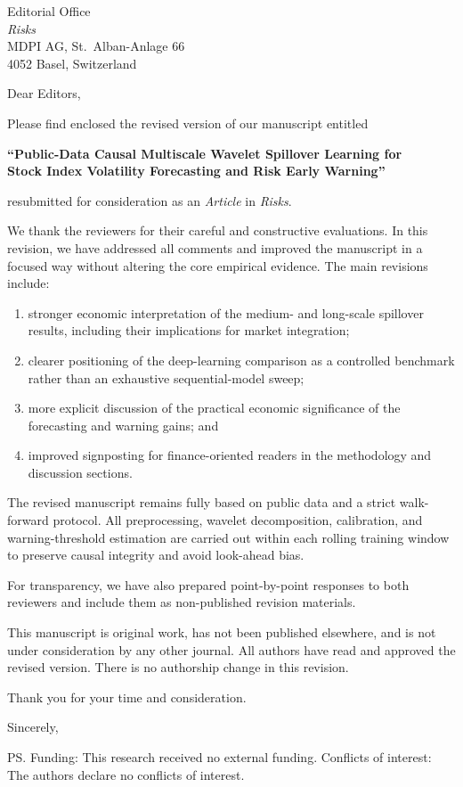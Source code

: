 \documentclass[11pt, a4paper]{letter}
\date{26 May 2026}
\begin{document}
\begin{letter}{%
  Editorial Office\\
  \textit{Risks}\\
  MDPI AG, St.\ Alban-Anlage 66\\
  4052 Basel, Switzerland
}

\opening{Dear Editors,}

Please find enclosed the revised version of our manuscript entitled

\begin{center}
  \textbf{``Public-Data Causal Multiscale Wavelet Spillover Learning for\\
  Stock Index Volatility Forecasting and Risk Early Warning''}
\end{center}

\noindent resubmitted for consideration as an \textit{Article} in
\textit{Risks}.

We thank the reviewers for their careful and constructive evaluations.
In this revision, we have addressed all comments and improved the
manuscript in a focused way without altering the core empirical evidence.
The main revisions include:
\begin{enumerate}
  \item stronger economic interpretation of the medium- and long-scale
    spillover results, including their implications for market integration;
  \item clearer positioning of the deep-learning comparison as a
    controlled benchmark rather than an exhaustive sequential-model sweep;
  \item more explicit discussion of the practical economic significance of
    the forecasting and warning gains; and
  \item improved signposting for finance-oriented readers in the
    methodology and discussion sections.
\end{enumerate}

The revised manuscript remains fully based on public data and a strict
walk-forward protocol. All preprocessing, wavelet decomposition,
calibration, and warning-threshold estimation are carried out within each
rolling training window to preserve causal integrity and avoid look-ahead
bias.

For transparency, we have also prepared point-by-point responses to both
reviewers and include them as non-published revision materials.

This manuscript is original work, has not been published elsewhere, and is
not under consideration by any other journal. All authors have read and
approved the revised version. There is no authorship change in this
revision.

Thank you for your time and consideration.

\closing{Sincerely,}

\ps{Funding: This research received no external funding. Conflicts of
interest: The authors declare no conflicts of interest.}

\end{letter}
\end{document}
